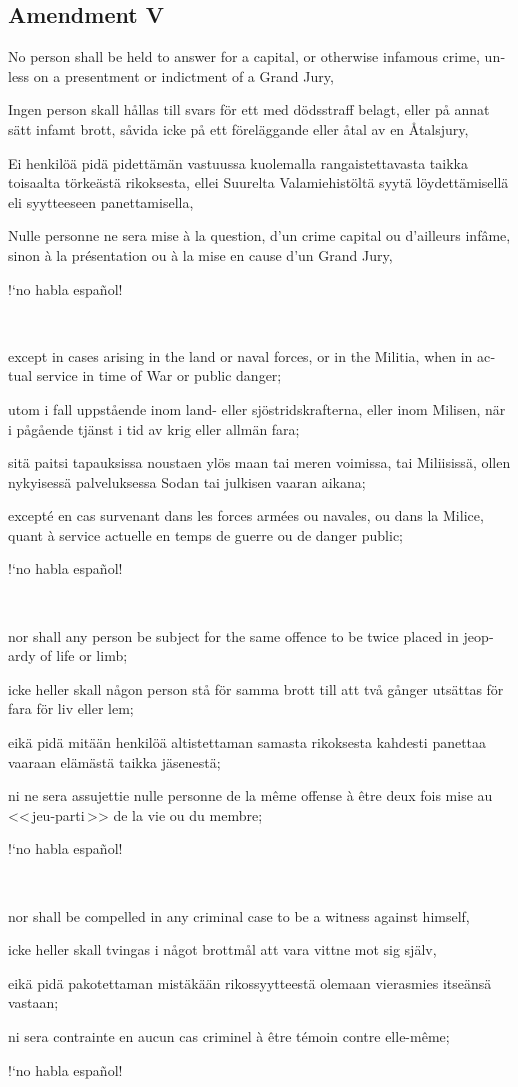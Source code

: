 \documentclass[a4paper,landscape,10pt]{article}
\newcommand{\tblock}[5]{\noindent\begin{minipage}[t]{0.18\textwidth}\foreignlanguage{english}{#1}\end{minipage}\hskip 0.025\textwidth\begin{minipage}[t]{0.18\textwidth}\foreignlanguage{swedish}{#2}\end{minipage}\hskip 0.025\textwidth\begin{minipage}[t]{0.18\textwidth}\foreignlanguage{finnish}{#3}\end{minipage}\hskip 0.025\textwidth\begin{minipage}[t]{0.18\textwidth}\foreignlanguage{french}{#4}\end{minipage}\hskip 0.025\textwidth\begin{minipage}[t]{0.18\textwidth}\foreignlanguage{spanish}{#5}\end{minipage}}
\begin{document}
\subsection*{Amendment V}
\tblock
{No person shall be held to answer for a capital, or otherwise infamous crime, unless on a presentment or indictment of a Grand Jury,}
{Ingen person skall hållas till svars för ett med dödsstraff belagt, eller på annat sätt infamt brott, såvida icke på ett föreläggande eller åtal av en Åtalsjury,}
{Ei henkilöä pidä pidettämän vastuussa kuolemalla rangaistettavasta taikka toisaalta törkeästä rikoksesta, ellei Suurelta Valamiehistöltä syytä löydettämisellä eli syytteeseen panettamisella,}
{Nulle personne ne sera mise à la question, d'un crime capital ou d'ailleurs infâme, sinon à la présentation ou à la mise en cause d'un Grand Jury,}
{!`no habla español!}

~

\tblock
{except in cases arising in the land or naval forces, or in the Militia, when in actual service in time of War or public danger;}
{utom i fall uppstående inom land- eller sjöstridskrafterna, eller inom Milisen, när i pågående tjänst i tid av krig eller allmän fara;}
{sitä paitsi tapauksissa noustaen ylös maan tai meren voimissa, tai Miliisissä, ollen nykyisessä palveluksessa Sodan tai julkisen vaaran aikana;}
{excepté en cas survenant dans les forces armées ou navales, ou dans la Milice, quant à service actuelle en temps de guerre ou de danger public;}
{!`no habla español!}

~

\tblock
{nor shall any person be subject for the same offence to be twice placed in jeopardy of life or limb;}
{icke heller skall någon person stå för samma brott till att två gånger utsättas för fara för liv eller lem;}
{eikä pidä mitään henkilöä altistettaman samasta rikoksesta kahdesti panettaa vaaraan elämästä taikka jäsenestä;}
{ni ne sera assujettie nulle personne de la même offense à être deux fois mise au <<\,jeu-parti\,>> de la vie ou du membre;}
{!`no habla español!}

~

\tblock
{nor shall be compelled in any criminal case to be a witness against himself,}
{icke heller skall tvingas i något brottmål att vara vittne mot sig själv,}
{eikä pidä pakotettaman mistäkään rikossyytteestä olemaan vierasmies itseänsä vastaan;}
{ni sera contrainte en aucun cas criminel à être témoin contre elle-même;}
{!`no habla español!}

~
\end{document}
